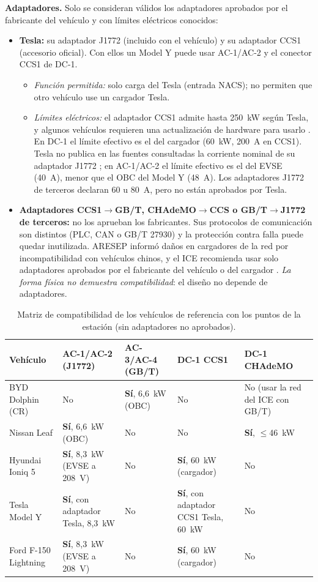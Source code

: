 \textbf{Adaptadores.} Solo se consideran válidos los adaptadores aprobados por el fabricante del vehículo y con límites eléctricos conocidos:
\begin{itemize}
\item \textbf{Tesla:} su adaptador J1772 (incluido con el vehículo) y su adaptador CCS1 (accesorio oficial). Con ellos un Model Y puede usar AC-1/AC-2 y el conector CCS1 de DC-1.
  \begin{itemize}
  \item \emph{Función permitida:} solo carga del Tesla (entrada NACS); no permiten que otro vehículo use un cargador Tesla.
  \item \emph{Límites eléctricos:} el adaptador CCS1 admite hasta \SI{250}{\kilo\watt} según Tesla, y algunos vehículos requieren una actualización de hardware para usarlo \cite{teslaCCS}. En DC-1 el límite efectivo es el del cargador (\SI{60}{\kilo\watt}, \SI{200}{\ampere} en CCS1). Tesla no publica en las fuentes consultadas la corriente nominal de su adaptador J1772 \supuesto{}; en AC-1/AC-2 el límite efectivo es el del EVSE (\SI{40}{\ampere}), menor que el OBC del Model Y (\SI{48}{\ampere}). Los adaptadores J1772 de terceros declaran 60 u 80~A, pero no están aprobados por Tesla.
  \end{itemize}
\item \textbf{Adaptadores CCS1$\rightarrow$GB/T, CHAdeMO$\rightarrow$CCS o GB/T$\rightarrow$J1772 de terceros:} no los aprueban los fabricantes. Sus protocolos de comunicación son distintos (PLC, CAN o GB/T 27930) y la protección contra falla puede quedar inutilizada. ARESEP informó daños en cargadores de la red por incompatibilidad con vehículos chinos, y el ICE recomienda usar solo adaptadores aprobados por el fabricante del vehículo o del cargador \cite{delfinoAresep}. \emph{La forma física no demuestra compatibilidad}: el diseño no depende de adaptadores.
\end{itemize}

\begin{table}[H]
\centering\small
\caption{Matriz de compatibilidad de los vehículos de referencia con los puntos de la estación (sin adaptadores no aprobados).}\label{tab:matriz}
\begin{tabularx}{\textwidth}{L{4.0cm}YYYY}
\toprule
\textbf{Vehículo} & \textbf{AC-1/AC-2 (J1772)} & \textbf{AC-3/AC-4 (GB/T)} & \textbf{DC-1 CCS1} & \textbf{DC-1 CHAdeMO}\\
\midrule
BYD Dolphin (CR) & No & \textbf{Sí}, 6,6~kW (OBC) & No & No (usar la red del ICE con GB/T)\\
Nissan Leaf & \textbf{Sí}, 6,6~kW (OBC) & No & No & \textbf{Sí}, $\le$46~kW\\
Hyundai Ioniq 5 & \textbf{Sí}, 8,3~kW (EVSE a 208~V) & No & \textbf{Sí}, 60~kW (cargador) & No\\
Tesla Model Y & \textbf{Sí}, con adaptador Tesla, 8,3~kW & No & \textbf{Sí}, con adaptador CCS1 Tesla, 60~kW & No\\
Ford F-150 Lightning & \textbf{Sí}, 8,3~kW (EVSE a 208~V) & No & \textbf{Sí}, 60~kW (cargador) & No\\
\bottomrule
\end{tabularx}
\end{table}

